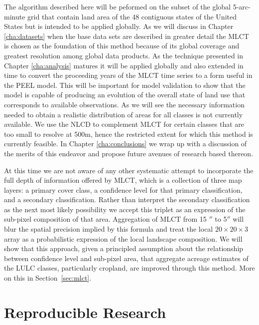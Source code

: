 The algorithm described here will be peformed on the subset of the
global 5-arc-minute grid that contain land area of the 48 contiguous
states of the United States but is intended to be applied globally.
As we will discuss in Chapter \ref{cha:datasets} when the base data
sets are described in greater detail the MLCT is chosen as the
foundation of this method because of its global coverage and greatest
resolution among global data products.  As the technique presented in
Chapter \ref{cha:analysis} matures it will be applied globally and
also extended in time to convert the proceeding years of the MLCT time
series to a form useful in the PEEL model.  This will be important for
model validation to show that the model is capable of producing an
evolution of the overall state of land use that corresponds to
available observations.  As we will see the necessary information
needed to obtain a realistic distribution of areas for all classes is
not currently available.  We use the NLCD to complement MLCT for
certain classes that are too small to resolve at 500m, hence the
restricted extent for which this method is currently feasible.  In
Chapter \ref{cha:conclusions} we wrap up with a discussion of the
merits of this endeavor and propose future avenues of research based
thereon.

At this time we are not aware of any other systematic attempt to
incorporate the full depth of information offered by MLCT, which is a
collection of three map layers: a primary cover class, a confidence
level for that primary classification, and a secondary classification.
Rather than interpret the secondary classification as the next most
likely possibility we accept this triplet as an expression of the
sub-pixel composition of that area.  Aggregation of MLCT from 15
$''$ to 5$''$ will blur the spatial precision implied
by this formula and treat the local $20 \times 20 \times 3$ array as a
probabilistic expression of the local landscape composition.  We will
show that this approach, given a principled assumption about the
relationship between confidence level and sub-pixel area, that
aggregate acreage estimates of the LULC classes, particularly
cropland, are improved through this method.  More on this in Section~\ref{sec:mlct}.

\section{Reproducible Research}
\label{sec:reproducible}

